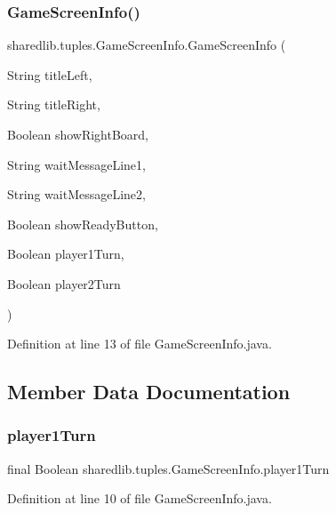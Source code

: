 \subsubsection{\texorpdfstring{Game\+Screen\+Info()}{GameScreenInfo()}}
{\footnotesize\ttfamily sharedlib.\+tuples.\+Game\+Screen\+Info.\+Game\+Screen\+Info (\begin{DoxyParamCaption}\item[{String}]{title\+Left,  }\item[{String}]{title\+Right,  }\item[{Boolean}]{show\+Right\+Board,  }\item[{String}]{wait\+Message\+Line1,  }\item[{String}]{wait\+Message\+Line2,  }\item[{Boolean}]{show\+Ready\+Button,  }\item[{Boolean}]{player1\+Turn,  }\item[{Boolean}]{player2\+Turn }\end{DoxyParamCaption})}



Definition at line 13 of file Game\+Screen\+Info.\+java.



\subsection{Member Data Documentation}
\hypertarget{classsharedlib_1_1tuples_1_1_game_screen_info_a38ed897b3243178155fe43f55c83556c}{}\label{classsharedlib_1_1tuples_1_1_game_screen_info_a38ed897b3243178155fe43f55c83556c} 
\subsubsection{\texorpdfstring{player1\+Turn}{player1Turn}}
{\footnotesize\ttfamily final Boolean sharedlib.\+tuples.\+Game\+Screen\+Info.\+player1\+Turn}



Definition at line 10 of file Game\+Screen\+Info.\+java.

\hypertarget{classsharedlib_1_1tuples_1_1_game_screen_info_ae6af422c349ee6dd17af8d2a585e2d2b}{}\label{classsharedlib_1_1tuples_1_1_game_screen_info_ae6af422c349ee6dd17af8d2a585e2d2b} 
